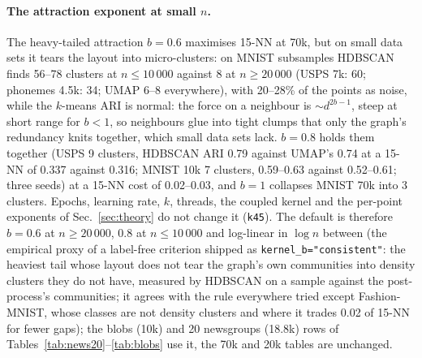 \documentclass[11pt]{article}
\begin{document}
\paragraph{The attraction exponent at small $n$.} The heavy-tailed attraction $b = 0.6$ maximises 15-NN at
70k, but on small data sets it tears the layout into micro-clusters: on MNIST subsamples HDBSCAN finds 56--78
clusters at $n \le 10\,000$ against 8 at $n \ge 20\,000$ (USPS 7k: 60; phonemes 4.5k: 34; UMAP 6--8
everywhere), with 20--28\% of the points as noise, while the $k$-means ARI is normal: the force on a neighbour is
$\sim d^{2b-1}$, steep at short range for $b < 1$, so neighbours glue into tight clumps that only the graph's
redundancy knits together, which small data sets lack. $b = 0.8$ holds them together (USPS 9 clusters, HDBSCAN ARI
0.79 against UMAP's 0.74 at a 15-NN of 0.337 against 0.316; MNIST 10k 7 clusters, 0.59--0.63 against 0.52--0.61;
three seeds) at a 15-NN cost of 0.02--0.03, and $b = 1$ collapses MNIST 70k into 3 clusters. Epochs, learning rate, $k$, threads,
the coupled kernel and the per-point exponents of Sec.~\ref{sec:theory} do not change it (\texttt{k45}). The
default is therefore $b = 0.6$ at $n \ge 20\,000$, $0.8$ at $n \le 10\,000$ and log-linear in $\log n$ between
(the empirical proxy of a label-free criterion shipped as \texttt{kernel\_b="consistent"}: the heaviest tail whose
layout does not tear the graph's own communities into density clusters they do not have, measured by HDBSCAN on a
sample against the post-process's communities; it agrees with the rule everywhere tried except Fashion-MNIST, whose
classes are not density clusters and where it trades 0.02 of 15-NN for fewer gaps);
the blobs (10k) and 20 newsgroups (18.8k) rows of Tables~\ref{tab:news20}--\ref{tab:blobs} use it, the 70k and 20k
tables are unchanged.
\end{document}
